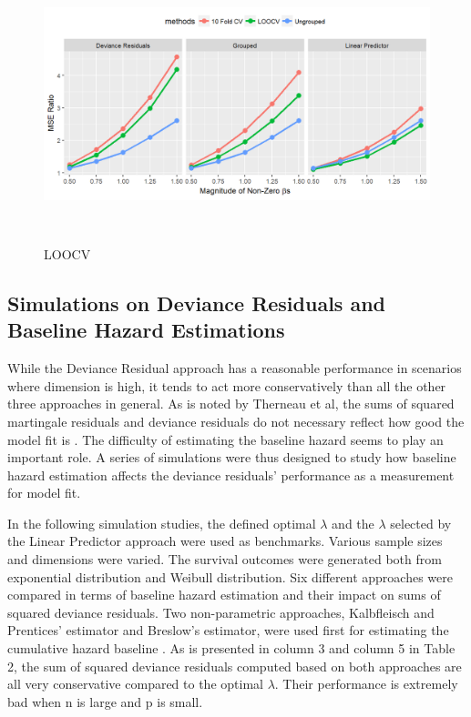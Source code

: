 \begin{figure}[h]
    \centering
		\includegraphics[height= 8cm ]{./figures/figure_4.png}
    \caption{LOOCV}
\end{figure}	

  \subsection {Simulations on Deviance Residuals and Baseline Hazard Estimations}
\par While the Deviance Residual approach has a reasonable performance in scenarios where dimension is high, it tends to act more conservatively than all the other three approaches in general. As is noted by Therneau et al, the sums of squared martingale residuals and deviance residuals do not necessary reflect how good the model fit is \citep{Therneau2000modeling}. The difficulty of estimating the baseline hazard seems to play an important role. A series of simulations were thus designed to study how baseline hazard estimation affects the deviance residuals' performance as a measurement for model fit. 

\par In the following simulation studies, the defined optimal $\lambda$ and the $\lambda$ selected by the Linear Predictor approach were used as benchmarks. Various sample sizes and dimensions were varied. The survival outcomes were generated both from exponential distribution and Weibull distribution. Six different approaches were compared in terms of baseline hazard estimation and their impact on sums of squared deviance residuals. Two non-parametric approaches, Kalbfleisch and Prentices' estimator and Breslow's estimator, were used first for estimating the cumulative hazard baseline \citep{Kalbfleisch2011} \citep{breslow1972}.  As is presented in column 3 and column 5 in Table 2, the sum of squared deviance residuals computed based on both approaches are all very conservative compared to the optimal $\lambda$. Their performance is extremely bad when n is large and p is small. 

